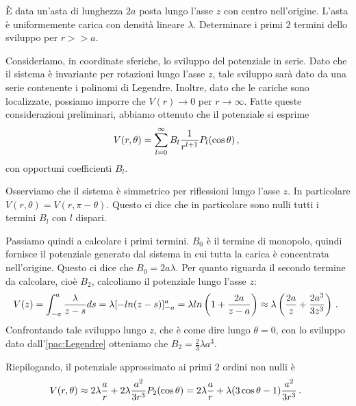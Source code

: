 \documentclass[../main.tex]{subfiles}
\begin{document}

\textex

È data un'asta di lunghezza $2a$ posta lungo l'asse $z$ con centro nell'origine. L'asta è uniformemente carica con densità lineare $\lambda$. Determinare i primi 2 termini dello sviluppo per $r>>a$.

\solution

Consideriamo, in coordinate sferiche, lo sviluppo del potenziale in serie. Dato che il sistema è invariante per rotazioni lungo l'asse $z$, tale sviluppo sarà dato da una serie contenente i polinomi di Legendre. Inoltre, dato che le cariche sono localizzate, possiamo imporre che $V(r)\rightarrow 0$ per $r\rightarrow \infty$. Fatte queste considerazioni preliminari, abbiamo ottenuto che il potenziale si esprime
\begin{equation}\label{pac:Legendre}
	V(r,\theta)=\sum_{l=0}^{\infty} B_l\frac{1}{r^{l+1}}P_l(\cos \theta)\, \text{, }
\end{equation}
con opportuni coefficienti $B_l$.

Osserviamo che il sistema è simmetrico per riflessioni lungo l'asse $z$. In particolare $V(r,\theta)=V(r,\pi-\theta)$. Questo ci dice che in particolare sono nulli tutti i termini $B_l$ con $l$ dispari.

Passiamo quindi a calcolare i primi termini. $B_0$ è il termine di monopolo, quindi fornisce il potenziale generato dal sistema in cui tutta la carica è concentrata nell'origine. Questo ci dice che $B_0=2a\lambda$. Per quanto riguarda il secondo termine da calcolare, cioè $B_2$, calcoliamo il potenziale lungo l'asse $z$:
\[
	V(z)=\int_{-a}^a \frac{\lambda}{z-s}ds=\lambda [-ln(z-s)]_{-a}^a= \lambda ln\left(1+\frac{2a}{z-a}\right)\approx \lambda \left(\frac{2a}{z}+\frac{2a^3}{3z^3}\right)\, \text{. }
\]
Confrontando tale sviluppo lungo $z$, che è come dire lungo $\theta=0$, con lo sviluppo dato dall'\cref{pac:Legendre} otteniamo che $B_2=\frac{2}{3}\lambda a^3$.

Riepilogando, il potenziale approssimato ai primi 2 ordini non nulli è
\[
	V(r,\theta)\approx2\lambda \frac{a}{r}+2\lambda\frac{a^2}{3r^3}P_2(\cos \theta)=2\lambda \frac{a}{r}+\lambda(3\cos\theta -1)\frac{a^2}{3r^3}\, \text{. }
\]
\end{document}
